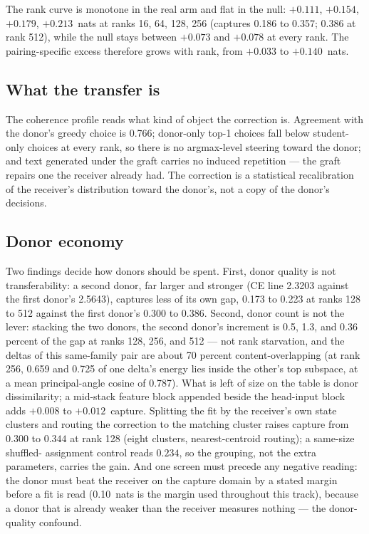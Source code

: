\documentclass[11pt]{article}
\begin{document}
The rank curve is monotone in the real arm and flat in the null:
$+0.111$, $+0.154$, $+0.179$, $+0.213$~nats at ranks 16, 64, 128,
256 (captures 0.186 to 0.357; 0.386 at rank 512), while the null
stays between $+0.073$ and $+0.078$ at every rank. The
pairing-specific excess therefore grows with rank, from $+0.033$
to $+0.140$~nats.

\subsection{What the transfer is}

The coherence profile reads what kind of object the correction is.
Agreement with the donor's greedy choice is 0.766; donor-only
top-1 choices fall below student-only choices at every rank, so
there is no argmax-level steering toward the donor; and text
generated under the graft carries no induced repetition --- the
graft repairs one the receiver already had. The correction is a
statistical recalibration of the receiver's distribution toward
the donor's, not a copy of the donor's decisions.

\subsection{Donor economy}

Two findings decide how donors should be spent. First, donor
quality is not transferability: a second donor, far larger and
stronger (CE line 2.3203 against the first donor's 2.5643),
captures less of its own gap, 0.173 to 0.223 at ranks 128 to 512
against the first donor's 0.300 to 0.386. Second, donor count is
not the lever: stacking the two donors, the second donor's
increment is 0.5, 1.3, and 0.36 percent of the gap at ranks 128,
256, and 512 --- not rank starvation, and the deltas of this
same-family pair are about 70 percent content-overlapping (at
rank 256, 0.659 and 0.725 of one delta's energy lies inside the
other's top subspace, at a mean principal-angle cosine of 0.787).
What is left of size on the table is donor dissimilarity; a
mid-stack feature block appended beside the head-input block adds
$+0.008$ to $+0.012$~capture. Splitting the fit by the receiver's
own state clusters and routing the correction to the matching
cluster raises capture from $0.300$ to $0.344$ at rank 128 (eight
clusters, nearest-centroid routing); a same-size shuffled-
assignment control reads $0.234$, so the grouping, not the extra
parameters, carries the gain. And one screen must precede any
negative reading: the donor must beat the receiver on the capture
domain by a stated margin before a fit is read (0.10~nats is the
margin used throughout this track), because a donor that is
already weaker than the receiver measures nothing --- the
donor-quality confound.
\end{document}
